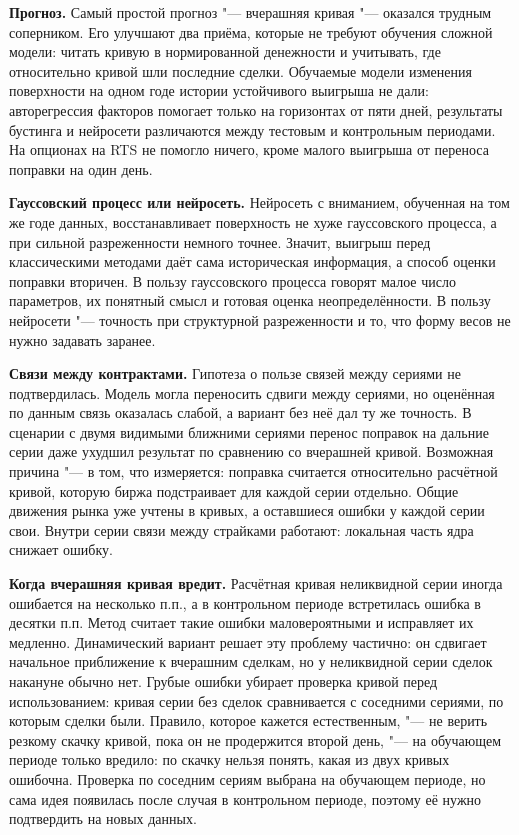 \documentclass{article}
\begin{document}
\textbf{Прогноз.} Самый простой прогноз "--- вчерашняя кривая "--- оказался трудным соперником. Его улучшают два приёма, которые не требуют обучения сложной модели: читать кривую в нормированной денежности и учитывать, где относительно кривой шли последние сделки. Обучаемые модели изменения поверхности на одном годе истории устойчивого выигрыша не дали: авторегрессия факторов помогает только на горизонтах от пяти дней, результаты бустинга и нейросети различаются между тестовым и контрольным периодами. На опционах на RTS не помогло ничего, кроме малого выигрыша от переноса поправки на один день.

\textbf{Гауссовский процесс или нейросеть.} Нейросеть с вниманием, обученная на том же годе данных, восстанавливает поверхность не хуже гауссовского процесса, а при сильной разреженности немного точнее. Значит, выигрыш перед классическими методами даёт сама историческая информация, а способ оценки поправки вторичен. В пользу гауссовского процесса говорят малое число параметров, их понятный смысл и готовая оценка неопределённости. В пользу нейросети "--- точность при структурной разреженности и то, что форму весов не нужно задавать заранее.

\textbf{Связи между контрактами.} Гипотеза о пользе связей между сериями не подтвердилась. Модель могла переносить сдвиги между сериями, но оценённая по данным связь оказалась слабой, а вариант без неё дал ту же точность. В сценарии с двумя видимыми ближними сериями перенос поправок на дальние серии даже ухудшил результат по сравнению со вчерашней кривой. Возможная причина "--- в том, что измеряется: поправка считается относительно расчётной кривой, которую биржа подстраивает для каждой серии отдельно. Общие движения рынка уже учтены в кривых, а оставшиеся ошибки у каждой серии свои. Внутри серии связи между страйками работают: локальная часть ядра снижает ошибку.

\textbf{Когда вчерашняя кривая вредит.} Расчётная кривая неликвидной серии иногда ошибается на несколько п.п., а в контрольном периоде встретилась ошибка в десятки п.п. Метод считает такие ошибки маловероятными и исправляет их медленно. Динамический вариант решает эту проблему частично: он сдвигает начальное приближение к вчерашним сделкам, но у неликвидной серии сделок накануне обычно нет. Грубые ошибки убирает проверка кривой перед использованием: кривая серии без сделок сравнивается с соседними сериями, по которым сделки были. Правило, которое кажется естественным, "--- не верить резкому скачку кривой, пока он не продержится второй день, "--- на обучающем периоде только вредило: по скачку нельзя понять, какая из двух кривых ошибочна. Проверка по соседним сериям выбрана на обучающем периоде, но сама идея появилась после случая в контрольном периоде, поэтому её нужно подтвердить на новых данных.
\end{document}

